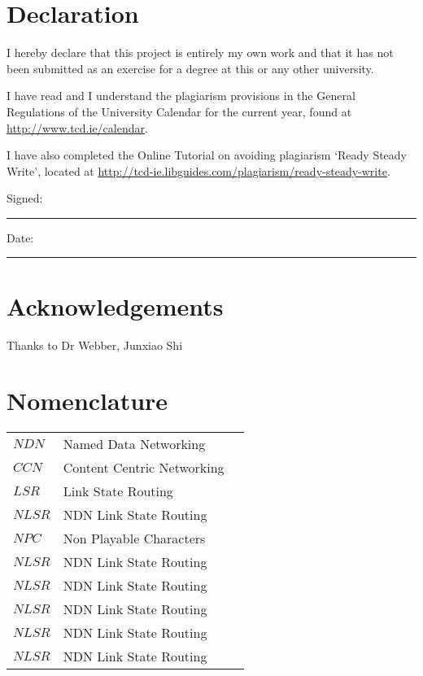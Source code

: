 \section*{Declaration}
\vspace{1cm}
I hereby declare that this project is entirely my own work and that it has not been submitted as an exercise for a degree at this or any other university.

\vspace{1cm}
I have read and I understand the plagiarism provisions in the General Regulations of the University Calendar for the current year, found at \url{http://www.tcd.ie/calendar}.
\vspace{1cm}

I have also completed the Online Tutorial on avoiding plagiarism `Ready Steady Write', located at
\url{http://tcd-ie.libguides.com/plagiarism/ready-steady-write}.
\vspace{3cm}

Signed:~\rule{5cm}{0.3pt}\hfill Date:~\rule{5cm}{0.3pt}

\newpage
\onehalfspacing
\raggedright %

\section*{Acknowledgements}
Thanks to Dr Webber, Junxiao Shi

\tableofcontents
\listoffigures
\listoftables
\lstlistoflistings
\newpage


\section*{Nomenclature}
\begin{tabular}{lp{15cm}l}
    $NDN$ & Named Data Networking \\
    $CCN$ & Content Centric Networking \\
    $LSR$ & Link State Routing \\
    $NLSR$ & NDN Link State Routing \\
    $NPC$ & Non Playable Characters \\
    $NLSR$ & NDN Link State Routing \\
    $NLSR$ & NDN Link State Routing \\
    $NLSR$ & NDN Link State Routing \\
    $NLSR$ & NDN Link State Routing \\
    $NLSR$ & NDN Link State Routing \\
\end{tabular}
\vspace{2cm}
